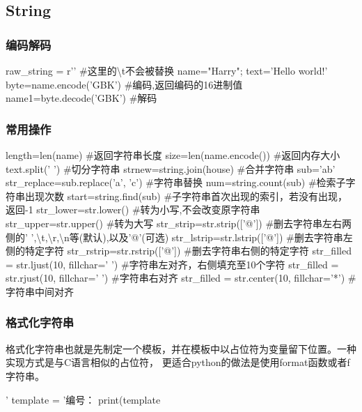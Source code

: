   \subsection{String}
    \subsubsection{编码解码}
      \begin{codeblock}[language=python, caption={create a string}]
        raw_string = r'\tTab' #这里的\textbackslash t不会被替换
        name="Harry"; text='Hello world!'
        byte=name.encode('GBK') #编码,返回编码的16进制值
        name1=byte.decode('GBK') #解码
      \end{codeblock}

    \subsubsection{常用操作}
      \begin{codeblock}[language=python, caption={basic operations of string}]
        length=len(name) #返回字符串长度
        size=len(name.encode()) #返回内存大小
        text.split(' ') #切分字符串
        strnew=string.join(house) #合并字符串
        sub='ab'
        str_replace=sub.replace('a', 'c') #字符串替换
        num=string.count(sub) #检索子字符串出现次数
        start=string.find(sub) #子字符串首次出现的索引，若没有出现，返回-1
        str_lower=str.lower() #转为小写,不会改变原字符串
        str_upper=str.upper() #转为大写
        str_strip=str.strip(['@']) #删去字符串左右两侧的' ',\textbackslash t,\textbackslash r,\textbackslash n等(默认),以及'@'(可选)
        str_lstrip=str.lstrip(['@']) #删去字符串左侧的特定字符
        str_rstrip=str.rstrip(['@']) #删去字符串右侧的特定字符
        str_filled = str.ljust(10, fillchar=' ') #字符串左对齐，右侧填充至10个字符
        str_filled = str.rjust(10, fillchar=' ') #字符串右对齐
        str_filled = str.center(10, fillchar='*') #字符串中间对齐
      \end{codeblock}

    \subsubsection{格式化字符串}
      格式化字符串也就是先制定一个模板，并在模板中以占位符为变量留下位置。一种实现方式是与C语言相似的占位符，
      更适合python的做法是使用format函数或者f字符串。
      \begin{codeblock}[language=python, caption={formatting string1}]
        '%
        template = '编号：%
        print(template%
      \end{codeblock}

